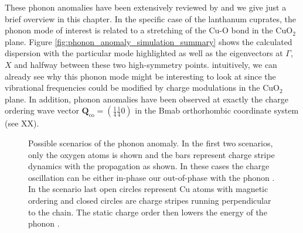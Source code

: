 These phonon anomalies have been extensively reviewed by \citeauthor{Reznik2012} \cite{Reznik2012} and we give just a brief overview in this chapter. In the specific case of the lanthanum cuprates, the phonon mode of interest is related to a stretching of the Cu-O bond in the CuO$_2$ plane. Figure \ref{fig:phonon_anomaly_simulation_summary} shows the calculated dispersion with the particular mode highlighted as well as the eigenvectors at $\Gamma$, $X$ and halfway between these two high-symmetry points. intuitively, we can already see why this phonon mode might be interesting to look at since the vibrational frequencies could be modified by charge modulations in the CuO$_2$ plane. In addition, phonon anomalies have been observed at exactly the charge ordering wave vector $\bm{Q}_\text{co} = \left( \frac{1}{4} \frac{1}{4} 0 \right)$ in the Bmab orthorhombic coordinate system (see XX). 

\begin{figure}
    \centering
    \caption[1D phonon anomaly sketch]{Possible scenarios of the phonon anomaly. In the first two scenarios, only the oxygen atoms is shown and the bars represent charge stripe dynamics with the propagation as shown. In these cases the charge oscillation can be either in-phase our out-of-phase with the phonon \cite{Kaneshita2002}. In the scenario last open circles represent Cu atoms with magnetic ordering and closed circles are charge stripes running perpendicular to the chain. The static charge order then lowers the energy of the phonon \cite{Reznik2006}.}
    \label{fig:anomaly_1d}
\end{figure}

%     

